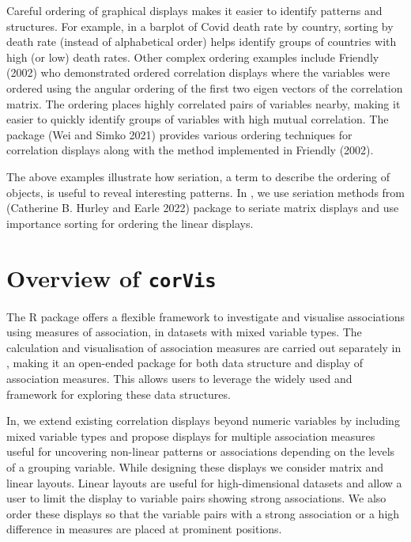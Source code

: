 Careful ordering of graphical displays makes it easier to identify patterns and structures. For example, in a barplot of Covid death rate by country, sorting by death rate (instead of alphabetical order) helps identify groups of countries with high (or low) death rates. Other complex ordering examples include Friendly (2002) who demonstrated ordered correlation displays where the variables were ordered using the angular ordering of the first two eigen vectors of the correlation matrix. The ordering places highly correlated pairs of variables nearby, making it easier to quickly identify groups of variables with high mutual correlation. The package  (Wei and Simko 2021) provides various ordering techniques for correlation displays along with the method implemented in Friendly (2002).

The above examples illustrate how seriation, a term to describe the ordering of objects, is useful to reveal interesting patterns. In , we use seriation methods from  (Catherine B. Hurley and Earle 2022) package to seriate matrix displays and use importance sorting for ordering the linear displays.

\hypertarget{overview-of-corvis}{%
\section{\texorpdfstring{Overview of \texttt{corVis}}{Overview of corVis}}\label{overview-of-corvis}}

The R package  offers a flexible framework to investigate and visualise associations using measures of association, in datasets with mixed variable types. The calculation and visualisation of association measures are carried out separately in , making it an open-ended package for both data structure and display of association measures. This allows users to leverage the widely used  and  framework for exploring these data structures.

In, we extend existing correlation displays beyond numeric variables by including mixed variable types and propose displays for multiple association measures useful for uncovering non-linear patterns or associations depending on the levels of a grouping variable. While designing these displays we consider matrix and linear layouts. Linear layouts are useful for high-dimensional datasets and allow a user to limit the display to variable pairs showing strong associations. We also order these displays so that the variable pairs with a strong association or a high difference in measures are placed at prominent positions.

